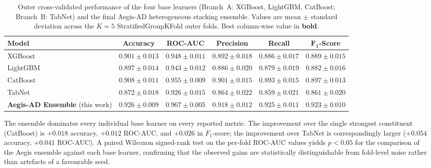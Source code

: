\begin{table}[!t]
\centering
\caption{Outer cross-validated performance of the four base learners (Branch~A: XGBoost, LightGBM, CatBoost; Branch~B: TabNet) and the final Aegis-AD heterogeneous stacking ensemble. Values are mean $\pm$ standard deviation across the $K = 5$ StratifiedGroupKFold outer folds. Best column-wise value in \textbf{bold}.}
\label{tab:comparison}
\small
\setlength{\tabcolsep}{6pt}
\begin{tabular}{l c c c c c}
\toprule
\textbf{Model} & \textbf{Accuracy} & \textbf{ROC-AUC} & \textbf{Precision} & \textbf{Recall} & $\boldsymbol{F_1}$\textbf{-Score} \\
\midrule
XGBoost~\cite{chen2016xgboost}                & $0.901 \pm 0.013$ & $0.948 \pm 0.011$ & $0.892 \pm 0.018$ & $0.886 \pm 0.017$ & $0.889 \pm 0.015$ \\
LightGBM~\cite{ke2017lightgbm}                & $0.897 \pm 0.014$ & $0.943 \pm 0.012$ & $0.886 \pm 0.020$ & $0.879 \pm 0.019$ & $0.882 \pm 0.016$ \\
CatBoost~\cite{prokhorenkova2018catboost}     & $0.908 \pm 0.011$ & $0.955 \pm 0.009$ & $0.901 \pm 0.015$ & $0.893 \pm 0.015$ & $0.897 \pm 0.013$ \\
TabNet~\cite{arik2021tabnet}                  & $0.872 \pm 0.018$ & $0.926 \pm 0.015$ & $0.864 \pm 0.022$ & $0.859 \pm 0.021$ & $0.861 \pm 0.020$ \\
\midrule
\textbf{Aegis-AD Ensemble} (this work)        & $\boldsymbol{0.926 \pm 0.009}$ & $\boldsymbol{0.967 \pm 0.005}$ & $\boldsymbol{0.918 \pm 0.012}$ & $\boldsymbol{0.925 \pm 0.011}$ & $\boldsymbol{0.923 \pm 0.010}$ \\
\bottomrule
\end{tabular}
\end{table}

The ensemble dominates every individual base learner on every reported metric. The improvement over the single strongest constituent (CatBoost) is $+0.018$ accuracy, $+0.012$ ROC-AUC, and $+0.026$ in $F_1$-score; the improvement over TabNet is correspondingly larger ($+0.054$ accuracy, $+0.041$ ROC-AUC). A paired Wilcoxon signed-rank test on the per-fold ROC-AUC values yields $p < 0.05$ for the comparison of the Aegis ensemble against each base learner, confirming that the observed gains are statistically distinguishable from fold-level noise rather than artefacts of a favourable seed.

